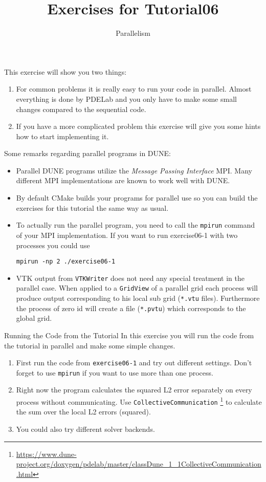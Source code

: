 \documentclass[12pt,a4paper]{article}
\title{\textbf{Exercises for Tutorial06}}
\subtitle{Parallelism}
\begin{document}
\exerciseheader

This exercise will show you two things:
\begin{enumerate}
\item For common problems it is really easy to run your code in
  parallel. Almost everything is done by PDELab and you only have to make
  some small changes compared to the sequential code.
\item If you have a more complicated problem this exercise will give
  you some hints how to start implementing it.
\end{enumerate}

Some remarks regarding parallel programs in DUNE:
\begin{itemize}
\item Parallel DUNE programs utilize the \emph{Message Passing
    Interface} MPI. Many different MPI implementations are known to
  work well with DUNE.
\item By default CMake builds your programs for parallel use so you
  can build the exercises for this tutorial the same way as usual.
\item To actually run the parallel program, you need to call the
  \lstinline{mpirun} command of your MPI implementation. If you want
  to run exercise06-1 with two processes you could use
  \begin{lstlisting}
mpirun -np 2 ./exercise06-1
  \end{lstlisting}
\item VTK output from \lstinline{VTKWriter} does not need any special
  treatment in the parallel case. When applied to a
  \lstinline{GridView} of a parallel grid each process will produce
  output corresponding to his local sub grid (\lstinline{*.vtu}
  files).  Furthermore the process of zero id will create a file
  (\lstinline{*.pvtu}) which corresponds to the global grid.
\end{itemize}

\begin{Exercise}{Running the Code from the Tutorial}
  In this exercise you will run the code from the tutorial in parallel
  and make some simple changes.
  \begin{enumerate}
  \item First run the code from \lstinline{exercise06-1} and try out
    different settings. Don't forget to use \lstinline{mpirun} if you
    want to use more than one process.
  \item Right now the program calculates the squared L2 error separately on
    every process without communicating. Use
    \lstinline{CollectiveCommunication}
    \footnote{\href{https://www.dune-project.org/doxygen/pdelab/master/classDune\_1\_1CollectiveCommunication.html}{https://www.dune-project.org/doxygen/pdelab/master/classDune\_1\_1CollectiveCommunication.html}}
    to calculate the sum over the local L2 errors (squared).
  \item You could also try different solver backends.
  \end{enumerate}
\end{Exercise}
\end{document}
